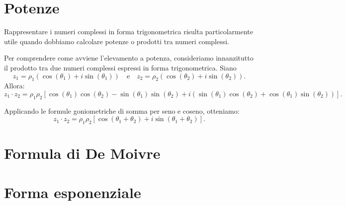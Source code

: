 \section{Potenze}
Rappresentare i numeri complessi in forma trigonometrica risulta particolarmente utile quando dobbiamo calcolare potenze o prodotti tra numeri complessi.

Per comprendere come avviene l’elevamento a potenza, consideriamo innanzitutto il prodotto tra due numeri complessi espressi in forma trigonometrica.  
Siano
\[
z_1 = \rho_1(\cos(\theta_1) + i\sin(\theta_1)) \quad \text{e} \quad 
z_2 = \rho_2(\cos(\theta_2) + i\sin(\theta_2)).
\]
Allora:
\[
z_1 \cdot z_2 = \rho_1 \rho_2 [\cos(\theta_1)\cos(\theta_2) - \sin(\theta_1)\sin(\theta_2) + i(\sin(\theta_1)\cos(\theta_2) + \cos(\theta_1)\sin(\theta_2))].
\]

Applicando le formule goniometriche di somma per seno e coseno, otteniamo:
\[
z_1 \cdot z_2 = \rho_1 \rho_2 [\cos(\theta_1 + \theta_2) + i\sin(\theta_1 + \theta_2)].
\]

\section{Formula di De Moivre}\label{formula-di-de-moivre}

\ex{
\[
\begin{aligned}
&(-1+i)^5 \quad (-1+i)=z\\
&\rho = \sqrt{2}\\
&Arg(z) = \frac{3}{4}\pi\\
&z=\sqrt{2}[\cos{\frac{3}{4}\pi}+i\sin{\frac{3}{4}\pi}]\\
&z^5=\sqrt{2}[\cos{\frac{15}{4}\pi}+i\sin{\frac{15}{4}\pi}]= 4\sqrt{2}[\frac{\sqrt{2}}{2}-\frac{\sqrt{2}}{2}i]=\\
&= 4(1-i)
\end{aligned}
\]
}

\section{Forma esponenziale}

